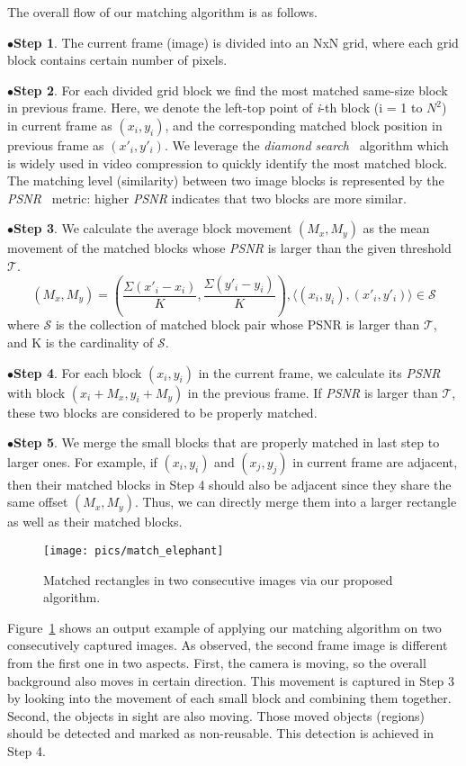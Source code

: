 \documentclass[10pt,acmtog]{acmart}
\begin{document}
The overall flow of our matching algorithm is as follows.

\noindent$\bullet$\textbf{Step 1}. The current frame (image) is divided into an NxN grid, where each grid block contains certain number of pixels.

\noindent$\bullet$\textbf{Step 2}. For each divided grid block we find the most matched same-size block in previous frame.
Here, we denote the left-top point of \emph{i}-th block (i = 1 to $N^2$) in current frame as $(x_i,y_i)$, and the corresponding matched block position in previous frame as $(x'_i,y'_i)$.
We leverage the \emph{diamond search}~\cite{zhu1997new} algorithm which is widely used in video compression to quickly identify the most matched block.
The matching level (similarity) between two image blocks is represented by the \emph{PSNR}~\cite{zhu1997new} metric: higher \emph{PSNR} indicates that two blocks are more similar.

\noindent$\bullet$\textbf{Step 3}. We calculate the average block movement $(M_x, M_y)$ as the mean movement of the matched blocks whose \emph{PSNR} is larger than the given threshold $\mathcal{T}$.
\[(M_x,M_y)=(\dfrac{\Sigma{(x'_i-x_i)}}{K},\dfrac{\Sigma{(y'_i-y_i)}}{K}), \langle (x_i,y_i),(x'_i,y'_i) \rangle \in \mathcal{S}\]
where $\mathcal{S}$ is the collection of matched block pair whose PSNR is larger than $\mathcal{T}$, and K is the cardinality of $\mathcal{S}$.

\noindent$\bullet$\textbf{Step 4}. For each block $(x_i,y_i)$ in the current frame, we calculate its \emph{PSNR} with block $(x_i+M_x,y_i+M_y)$ in the previous frame.
If \emph{PSNR} is larger than $\mathcal{T}$, these two blocks are considered to be properly matched.

\noindent$\bullet$\textbf{Step 5}. We merge the small blocks that are properly matched in last step to larger ones.
For example, if $(x_i,y_i)$ and $(x_j,y_j)$ in current frame are adjacent, then their matched blocks in Step 4 should also be adjacent since they share the same offset $(M_x,M_y)$.
Thus, we can directly merge them into a larger rectangle as well as their matched blocks.

\begin{figure}[t]
	\centering
	\texttt{[image: pics/match\_elephant]}
	\caption{Matched rectangles in two consecutive images via our proposed algorithm.}
	\label{fig:match_elephant}
\end{figure}

Figure~\ref{fig:match_elephant} shows an output example of applying our matching algorithm on two consecutively captured images.
As observed, the second frame image is different from the first one in two aspects.
First, the camera is moving, so the overall background also moves in certain direction.
This movement is captured in Step 3 by looking into the movement of each small block and combining them together.
Second, the objects in sight are also moving.
Those moved objects (regions) should be detected and marked as non-reusable.
This detection is achieved in Step 4.
\end{document}
